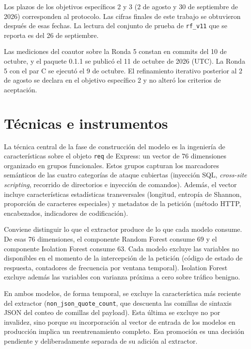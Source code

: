 Los plazos de los objetivos específicos 2 y 3 (2 de agosto y 30 de septiembre de 2026) corresponden al protocolo. Las cifras finales de este trabajo se obtuvieron después de esas fechas. La lectura del conjunto de prueba de \texttt{rf\_v11} que se reporta es del 26 de septiembre. 

Las mediciones del coautor sobre la Ronda 5 constan en commits del 10 de octubre, y el paquete 0.1.1 se publicó el 11 de octubre de 2026 (UTC). La Ronda 5 con el par C se ejecutó el 9 de octubre. El refinamiento iterativo posterior al 2 de agosto se declara en el objetivo específico 2 y no alteró los criterios de aceptación.

\section{Técnicas e instrumentos}\label{sec:tecnicas-instrumentos}

La técnica central de la fase de construcción del modelo es la ingeniería de características sobre el objeto \texttt{req} de Express: un vector de 76 dimensiones organizado en grupos funcionales. Estos grupos capturan los marcadores semánticos de las cuatro categorías de ataque cubiertas (inyección SQL, \textit{cross-site scripting}, recorrido de directorios e inyección de comandos). Además, el vector incluye características estadísticas transversales (longitud, entropía de Shannon, proporción de caracteres especiales) y metadatos de la petición (método HTTP, encabezados, indicadores de codificación).

Conviene distinguir lo que el extractor produce de lo que cada modelo consume. De esas 76 dimensiones, el componente Random Forest consume 69 y el componente Isolation Forest consume 63. Cada modelo excluye las variables no disponibles en el momento de la intercepción de la petición (código de estado de respuesta, contadores de frecuencia por ventana temporal). Isolation Forest excluye además las variables con varianza próxima a cero sobre tráfico benigno.

En ambos modelos, de forma temporal, se excluye la característica más reciente del extractor (\texttt{non\_json\_quote\_count}, que descuenta las comillas de sintaxis JSON del conteo de comillas del payload). Esta última se excluye no por invalidez, sino porque su incorporación al vector de entrada de los modelos en producción implica un reentrenamiento completo. Esa promoción es una decisión pendiente y deliberadamente separada de su adición al extractor.

